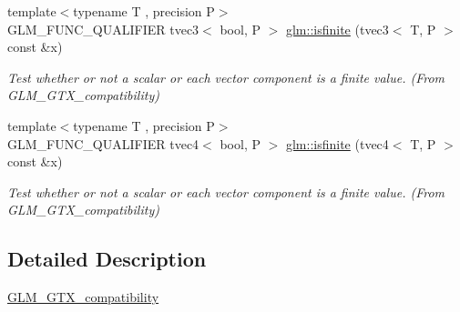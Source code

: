 \begin{DoxyCompactItemize}
{\footnotesize template$<$typename T , precision P$>$ }\\G\+L\+M\+\_\+\+F\+U\+N\+C\+\_\+\+Q\+U\+A\+L\+I\+F\+I\+ER tvec3$<$ bool, P $>$ \hyperlink{group__gtx__compatibility_ga1be9593d810fceb278a2854da8a25273}{glm\+::isfinite} (tvec3$<$ T, P $>$ const \&x)
\begin{DoxyCompactList}\small\item\em Test whether or not a scalar or each vector component is a finite value. (From G\+L\+M\+\_\+\+G\+T\+X\+\_\+compatibility) \end{DoxyCompactList}\item 
{\footnotesize template$<$typename T , precision P$>$ }\\G\+L\+M\+\_\+\+F\+U\+N\+C\+\_\+\+Q\+U\+A\+L\+I\+F\+I\+ER tvec4$<$ bool, P $>$ \hyperlink{group__gtx__compatibility_ga8c6a59e2f2ac84fba0c5932f1c35bf7a}{glm\+::isfinite} (tvec4$<$ T, P $>$ const \&x)
\begin{DoxyCompactList}\small\item\em Test whether or not a scalar or each vector component is a finite value. (From G\+L\+M\+\_\+\+G\+T\+X\+\_\+compatibility) \end{DoxyCompactList}\end{DoxyCompactItemize}


\subsection{Detailed Description}
\hyperlink{group__gtx__compatibility}{G\+L\+M\+\_\+\+G\+T\+X\+\_\+compatibility} 